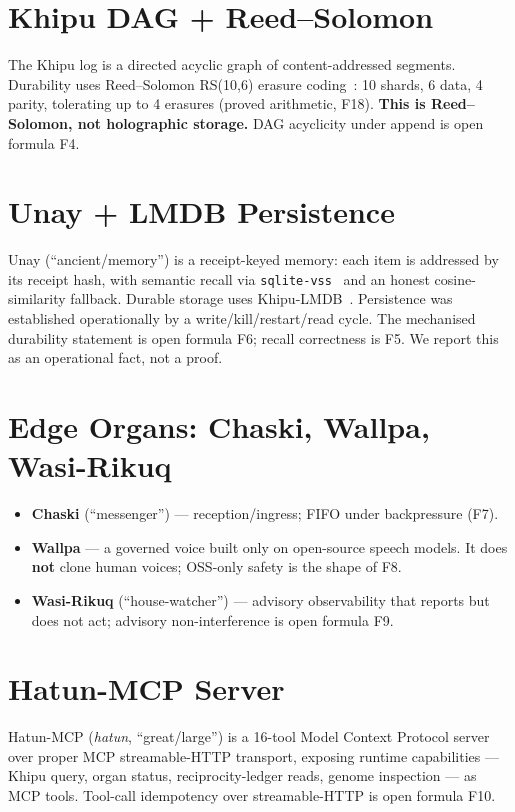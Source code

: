 \documentclass[11pt]{article}
\theoremstyle{plain}
\theoremstyle{definition}
\theoremstyle{remark}
\begin{document}
\section{Khipu DAG + Reed--Solomon}
\label{sec:khipudag}
The Khipu log is a directed acyclic graph of content-addressed segments. Durability uses
Reed--Solomon RS(10,6) erasure coding~\cite{reedsolomon1960}: 10 shards, 6 data, 4 parity,
tolerating up to 4 erasures (proved arithmetic, F18). \textbf{This is Reed--Solomon, not
holographic storage.} DAG acyclicity under append is open formula F4.

\section{Unay + LMDB Persistence}
\label{sec:unay}
Unay (``ancient/memory'') is a receipt-keyed memory: each item is addressed by its
receipt hash, with semantic recall via \texttt{sqlite-vss}~\cite{sqlitevss2023} and an
honest cosine-similarity fallback. Durable storage uses Khipu-LMDB~\cite{lmdb2011}.
Persistence was established operationally by a write/kill/restart/read cycle. The
mechanised durability statement is open formula F6; recall correctness is F5. We report
this as an operational fact, not a proof.

\section{Edge Organs: Chaski, Wallpa, Wasi-Rikuq}
\label{sec:edge}
\begin{itemize}[leftmargin=1.4em]
\item \textbf{Chaski} (``messenger'') --- reception/ingress; FIFO under backpressure (F7).
\item \textbf{Wallpa} --- a governed voice built only on open-source speech models. It
does \textbf{not} clone human voices; OSS-only safety is the shape of F8.
\item \textbf{Wasi-Rikuq} (``house-watcher'') --- advisory observability that reports but
does not act; advisory non-interference is open formula F9.
\end{itemize}

\section{Hatun-MCP Server}
\label{sec:hatun}
Hatun-MCP (\emph{hatun}, ``great/large'') is a 16-tool Model Context Protocol
server~\cite{mcp2024} over proper MCP streamable-HTTP transport, exposing runtime
capabilities --- Khipu query, organ status, reciprocity-ledger reads, genome inspection
--- as MCP tools. Tool-call idempotency over streamable-HTTP is open formula F10.
\end{document}
